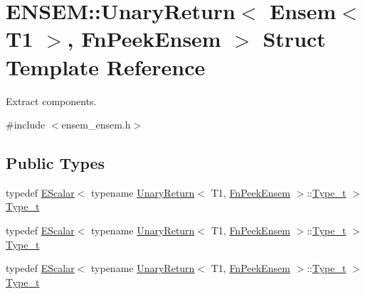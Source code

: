 \hypertarget{structENSEM_1_1UnaryReturn_3_01Ensem_3_01T1_01_4_00_01FnPeekEnsem_01_4}{}\section{E\+N\+S\+EM\+:\+:Unary\+Return$<$ Ensem$<$ T1 $>$, Fn\+Peek\+Ensem $>$ Struct Template Reference}
\label{structENSEM_1_1UnaryReturn_3_01Ensem_3_01T1_01_4_00_01FnPeekEnsem_01_4}


Extract components.  




{\ttfamily \#include $<$ensem\+\_\+ensem.\+h$>$}

\subsection*{Public Types}
\begin{DoxyCompactItemize}
\item 
typedef \mbox{\hyperlink{classENSEM_1_1EScalar}{E\+Scalar}}$<$ typename \mbox{\hyperlink{structENSEM_1_1UnaryReturn}{Unary\+Return}}$<$ T1, \mbox{\hyperlink{structENSEM_1_1FnPeekEnsem}{Fn\+Peek\+Ensem}} $>$\+::\mbox{\hyperlink{structENSEM_1_1UnaryReturn_3_01Ensem_3_01T1_01_4_00_01FnPeekEnsem_01_4_a3bb59903a0e3c8d5e4b6ce0ac99c5454}{Type\+\_\+t}} $>$ \mbox{\hyperlink{structENSEM_1_1UnaryReturn_3_01Ensem_3_01T1_01_4_00_01FnPeekEnsem_01_4_a3bb59903a0e3c8d5e4b6ce0ac99c5454}{Type\+\_\+t}}
\item 
typedef \mbox{\hyperlink{classENSEM_1_1EScalar}{E\+Scalar}}$<$ typename \mbox{\hyperlink{structENSEM_1_1UnaryReturn}{Unary\+Return}}$<$ T1, \mbox{\hyperlink{structENSEM_1_1FnPeekEnsem}{Fn\+Peek\+Ensem}} $>$\+::\mbox{\hyperlink{structENSEM_1_1UnaryReturn_3_01Ensem_3_01T1_01_4_00_01FnPeekEnsem_01_4_a3bb59903a0e3c8d5e4b6ce0ac99c5454}{Type\+\_\+t}} $>$ \mbox{\hyperlink{structENSEM_1_1UnaryReturn_3_01Ensem_3_01T1_01_4_00_01FnPeekEnsem_01_4_a3bb59903a0e3c8d5e4b6ce0ac99c5454}{Type\+\_\+t}}
\item 
typedef \mbox{\hyperlink{classENSEM_1_1EScalar}{E\+Scalar}}$<$ typename \mbox{\hyperlink{structENSEM_1_1UnaryReturn}{Unary\+Return}}$<$ T1, \mbox{\hyperlink{structENSEM_1_1FnPeekEnsem}{Fn\+Peek\+Ensem}} $>$\+::\mbox{\hyperlink{structENSEM_1_1UnaryReturn_3_01Ensem_3_01T1_01_4_00_01FnPeekEnsem_01_4_a3bb59903a0e3c8d5e4b6ce0ac99c5454}{Type\+\_\+t}} $>$ \mbox{\hyperlink{structENSEM_1_1UnaryReturn_3_01Ensem_3_01T1_01_4_00_01FnPeekEnsem_01_4_a3bb59903a0e3c8d5e4b6ce0ac99c5454}{Type\+\_\+t}}
\end{DoxyCompactItemize}


